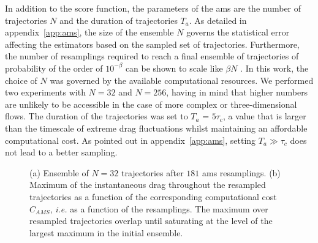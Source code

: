 In addition to the score function, the parameters of the \ac{ams} are the number of trajectories $N$ and the duration of trajectories $T_a$.
As detailed in appendix~\ref{app:ams}, the size of the ensemble $N$ governs the statistical error affecting the estimators based on the sampled set of trajectories.
Furthermore, the number of resamplings required to reach a final ensemble of trajectories of probability of the order of $10^{-\beta}$ can be shown to scale like $\beta N$ \citep{lestang_computing_2018}.
In this work, the choice of $N$ was governed by the available computational resources.
We performed two experiments with $N = 32$ and $N = 256$, having in mind that higher numbers are unlikely to be accessible in the case of more complex or three-dimensional flows.
The duration of the trajectories was set to $T_a$ = $5\tau_c$, a value that is larger than the timescale of extreme drag fluctuations whilst maintaining an affordable computational cost.
As pointed out in appendix~\ref{app:ams}, setting $T_a \gg \tau_c$ does not lead to a better sampling.

\begin{figure}
  \centering
  \caption{(a) Ensemble of $N = 32$ trajectories after $181$ \ac{ams} resamplings.
    (b) Maximum of the instantaneous drag throughout the resampled trajectories as a function of the corresponding computational cost $C_{AMS}$, \textit{i.e.} as a function of the resamplings. The maximum over resampled trajectories overlap until saturating at the level of the largest maximum in the initial ensemble.
  }
\end{figure}

